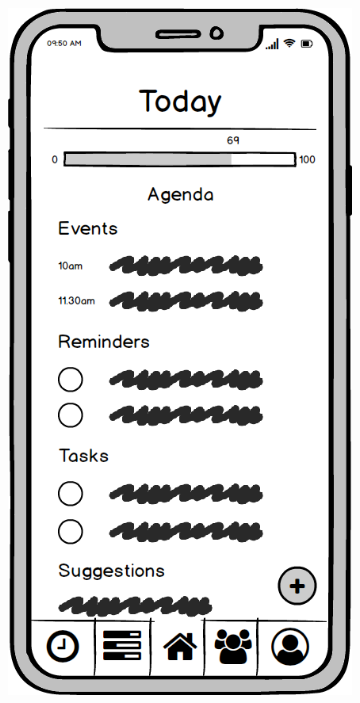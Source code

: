 \begin{figure}
\begin{subfigure}[b]{0.3\textwidth}
        \label{fig:forgotten_password}
    \end{subfigure}
    \hfill
    \begin{subfigure}[b]{0.3\textwidth}
        \centering
        \includegraphics[width=\textwidth]{./graphics/design/Dashboard.png}

\end{subfigure}
\end{figure}
